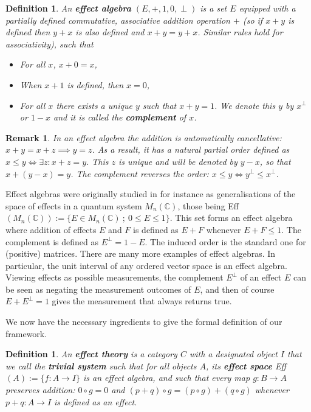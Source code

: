 \documentclass[a4paper,onecolumn,10pt,accepted=2019-05-03, issue=1, volume=1, shorttitle=papers/compositionality-1-1]{compositionalityarticle}
\newcounter{counter}
\numberwithin{counter}{section}
\newtheorem{definition}[counter]{Definition}
\newtheorem{remark}[counter]{Remark}
\newcommand{\C}{\mathbb{C}}
\begin{document}
\begin{definition}
	An \textbf{effect algebra} $(E,+,1,0,\perp)$ is a set $E$ equipped with a partially defined commutative, associative addition operation $+$ (so if $x+y$ is defined then $y+x$ is also defined and $x+y=y+x$. Similar rules hold for associativity), such that 
    \begin{itemize}
        \item For all $x$, $x+0=x$,
        \item When $x+1$ is defined, then $x=0$,
        \item For all $x$ there exists a unique $y$ such that $x+y=1$. We denote this $y$ by $x^\perp$ or $1-x$ and it is called the \textbf{complement} of $x$.
    \end{itemize}
\end{definition}
\begin{remark}
    In an effect algebra the addition is automatically cancellative: $x+y=x+z\implies y=z$. As a result, it has a natural partial order defined as $x\leq y\iff \exists z: x+z=y$. This $z$ is unique and will be denoted by $y-x$, so that $x+(y-x) = y$. The complement reverses the order: $x\leq y \iff y^\perp \leq x^\perp$.
\end{remark}

Effect algebras were originally studied in for instance \cite{foulis1994effect,bennett1997interval} as generalisations of the space of effects in a quantum system $M_n(\C)$, those being Eff$(M_n(\C)):= \{ E\in M_n(\C)~;~ 0\leq E\leq 1\}$. This set forms an effect algebra where addition of effects $E$ and $F$ is defined as $E+F$ whenever $E+F\leq 1$. The complement is defined as $E^\perp = 1-E$. The induced order is the standard one for (positive) matrices. There are many more examples of effect algebras. In particular, the unit interval of any ordered vector space is an effect algebra. Viewing effects as possible measurements, the complement $E^\perp$ of an effect $E$ can be seen as negating the measurement outcomes of $E$, and then of course $E+E^\perp = 1$ gives the measurement that always returns true.

We now have the necessary ingredients to give the formal definition of our framework.

\begin{definition}
	An \textbf{effect theory} is a category $C$ with a designated object $I$ that we call the \textbf{trivial system} such that for all objects $A$, its \textbf{effect space} Eff$(A):=\{f:A\rightarrow I\}$ is an effect algebra, and such that every map $g:B\rightarrow A$ preserves addition: $0\circ g = 0$ and $(p+q)\circ g = (p\circ g)+(q\circ g)$ whenever $p+q: A\rightarrow I$ is defined as an effect.
\end{definition}
\end{document}
